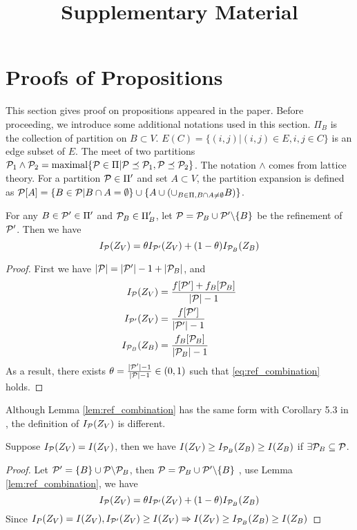 \documentclass{article}
\title{Supplementary Material}
\begin{document}
\maketitle
\appendix
\section{Proofs of Propositions}
This section gives proof on propositions appeared in the paper. Before proceeding, we introduce some additional notations used in this section. $\Pi_B$ is the collection of partition on $B\subset V$. $E(C)=\{(i,j) | (i,j)\in E, i,j \in C\}$ is an edge subset of $E$. The meet of two partitions $\P_1 \wedge \P_2 = \mathrm{maximal}\{\P \in \Pi | \P \preceq \P_1, \P \preceq \P_2\}$. The notation $\wedge$ comes from lattice theory. For a partition $\P \in \Pi'$ and set $ A \subset V$, the partition expansion is defined as $\P[A] = \{B \in \P | B \cap A = \emptyset \} \cup \{ A \cup (\cup_{B \in \Pi, B \cap A \neq \emptyset} B) \}$.

\begin{lemma}\label{lem:ref_combination}
For any $B \in \P' \in \Pi'$ and $\P_B \in \Pi'_B$, let $\P = \P_B \cup \P' \backslash \{B\} $
be the refinement of $\P'$. Then we have
\begin{equation}\label{eq:ref_combination}
I_{\P}(Z_V) = \theta I_{\P'}(Z_V) + (1-\theta) I_{\P_B}(Z_B)
\end{equation}
\end{lemma}
\begin{proof}
	First we have $\abs{\P} = \abs{\P'} -1 + \abs{\P_B}$,
 and
	\begin{align*}
		I_{\P}(Z_V) & = { f[\P'] + f_B[\P_B] \over \abs{\P} - 1} \\
		I_{\P'}(Z_V) & = { f[\P'] \over \abs{\P'} - 1} \\
		I_{\P_B}(Z_B) & = { f_B[\P_B] \over \abs{\P_B} - 1}
	\end{align*}
	As a result, there exists $\theta = {\abs{\P'} - 1 \over \abs{\P} - 1} \in (0,1)$ such that 
	\eqref{eq:ref_combination} holds.
\end{proof}
Although Lemma \ref{lem:ref_combination} has the same form with Corollary 5.3 in \cite{secretKey}, the definition of $I_{\P}(Z_V)$ is different. 
%
\begin{lemma}\label{lem:smallZB}
Suppose $I_{\P}(Z_V) = I(Z_V)$, then we have $I(Z_V) \geq I_{\P_B}(Z_B) \geq I(Z_B)$ if $\exists \P_B \subseteq \P$.
\end{lemma}
\begin{proof}
Let $\P' = \{B\} \cup \P\backslash \P_B$, then $\P = \P_B \cup \P'\backslash\{B\}$ , use Lemma \ref{lem:ref_combination}, we have
\begin{equation}
I_{\P}(Z_V) = \theta I_{\P'}(Z_V) + (1-\theta) I_{\P_B}(Z_B)
\end{equation}
Since  $I_{P}(Z_V) = I(Z_V), I_{\P'}(Z_V)\geq I(Z_V) \Rightarrow I(Z_V) \geq I_{\P_B}(Z_B) \geq I(Z_B)$ 
\end{proof}
\end{document}

